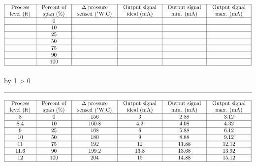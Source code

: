 \documentclass[12pt,a4paper]{article}
\def\svar{
           \advance\answnum by 1
           \ifnum \answnum > 0
                \hrule
                \vskip 3pt
                \leftline{Svar \the\answnum}
                \vskip 3pt \fi}
\begin{document}

$$\vbox{\offinterlineskip
\halign{\strut
\vrule \quad\hfil # \ \hfil & 
\vrule \quad\hfil # \ \hfil & 
\vrule \quad\hfil # \ \hfil & 
\vrule \quad\hfil # \ \hfil & 
\vrule \quad\hfil # \ \hfil & 
\vrule \quad\hfil # \ \hfil \vrule \cr
\noalign{\hrule}
%
Process & Percent of & $\Delta$ pressure & Output signal & Output signal & Output signal \cr
%
level (ft) & span (\%) & sensed ("W.C) & ideal (mA) & min. (mA) & max. (mA) \cr
%
\noalign{\hrule}
%
  & 0 &  &  &  &  \cr
%
\noalign{\hrule}
%
  & 10 &  &  &  &  \cr
%
\noalign{\hrule}
%
  & 25 &  &  &  &  \cr
%
\noalign{\hrule}
%
  & 50 &  &  &  &  \cr
%
\noalign{\hrule}
%
  & 75 &  &  &  &  \cr
%
\noalign{\hrule}
%
  & 90 &  &  &  &  \cr
%
\noalign{\hrule}
%
  & 100 &  &  &  &  \cr
%
\noalign{\hrule}
} %
}$$ %

\vskip 10pt \filbreak 





\svar{} 


$$\vbox{\offinterlineskip
\halign{\strut
\vrule \quad\hfil # \ \hfil & 
\vrule \quad\hfil # \ \hfil & 
\vrule \quad\hfil # \ \hfil & 
\vrule \quad\hfil # \ \hfil & 
\vrule \quad\hfil # \ \hfil & 
\vrule \quad\hfil # \ \hfil \vrule \cr
\noalign{\hrule}
%
Process & Percent of & $\Delta$ pressure & Output signal & Output signal & Output signal \cr
%
level (ft) & span (\%) & sensed ("W.C) & ideal (mA) & min. (mA) & max. (mA) \cr
%
\noalign{\hrule}
%
8 & 0 & 156 & 3 & 2.88 & 3.12 \cr
%
\noalign{\hrule}
%
8.4 & 10 & 160.8 & 4.2 & 4.08 & 4.32 \cr
%
\noalign{\hrule}
%
9 & 25 & 168 & 6 & 5.88 & 6.12 \cr
%
\noalign{\hrule}
%
10 & 50 & 180 & 9 & 8.88 & 9.12 \cr
%
\noalign{\hrule}
%
11 & 75 & 192 & 12 & 11.88 & 12.12 \cr
%
\noalign{\hrule}
%
11.6 & 90 & 199.2 & 13.8 & 13.68 & 13.92 \cr
%
\noalign{\hrule}
%
12 & 100 & 204 & 15 & 14.88 & 15.12 \cr
%
\noalign{\hrule}
} %
}$$ %

\vskip 10pt \filbreak 
\end{document}
